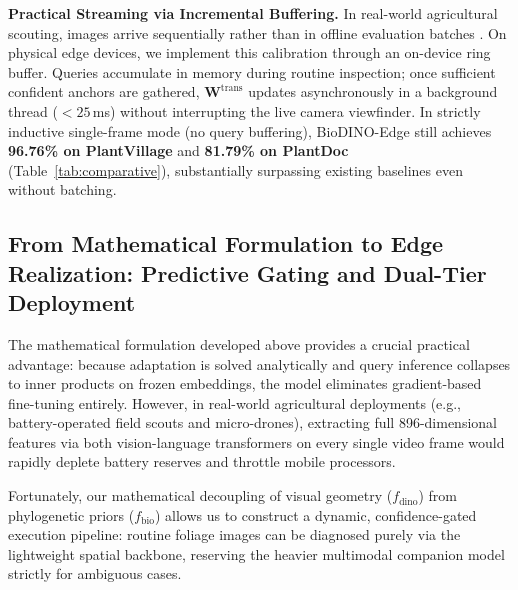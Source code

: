 \documentclass[conference]{IEEEtran}
\begin{document}
\textbf{Practical Streaming via Incremental Buffering.} In real-world agricultural scouting, images arrive sequentially rather than in offline evaluation batches \cite{boudiaf2020transductive}. On physical edge devices, we implement this calibration through an on-device ring buffer. Queries accumulate in memory during routine inspection; once sufficient confident anchors are gathered, $\mathbf{W}^{\text{trans}}$ updates asynchronously in a background thread ($<25$\,ms) without interrupting the live camera viewfinder. In strictly inductive single-frame mode (no query buffering), BioDINO-Edge still achieves \textbf{96.76\% on PlantVillage} and \textbf{81.79\% on PlantDoc} (Table~\ref{tab:comparative}), substantially surpassing existing baselines even without batching.

\subsection{From Mathematical Formulation to Edge Realization: Predictive Gating and Dual-Tier Deployment}
\label{sec:edge_gating}

The mathematical formulation developed above provides a crucial practical advantage: because adaptation is solved analytically and query inference collapses to inner products on frozen embeddings, the model eliminates gradient-based fine-tuning entirely. However, in real-world agricultural deployments (e.g., battery-operated field scouts and micro-drones), extracting full 896-dimensional features via both vision-language transformers on every single video frame would rapidly deplete battery reserves and throttle mobile processors.

Fortunately, our mathematical decoupling of visual geometry ($f_{\text{dino}}$) from phylogenetic priors ($f_{\text{bio}}$) allows us to construct a dynamic, confidence-gated execution pipeline: routine foliage images can be diagnosed purely via the lightweight spatial backbone, reserving the heavier multimodal companion model strictly for ambiguous cases.
\end{document}
